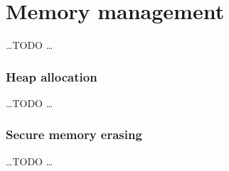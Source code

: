 \section{Memory management}\label{sec:memory}

\ldots TODO \ldots

\subsubsection{Heap allocation}

\ldots TODO \ldots

\subsubsection{Secure memory erasing}

\ldots TODO \ldots
